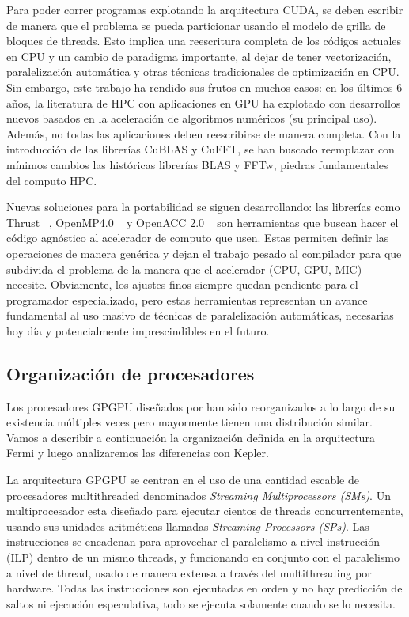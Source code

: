 Para poder correr programas explotando la arquitectura CUDA, se deben escribir de manera que
el problema se pueda particionar usando el modelo de grilla de bloques de threads. Esto implica una
reescritura completa de los c\'odigos actuales en CPU y un cambio de paradigma importante, al
dejar de tener vectorizaci\'on, paralelizaci\'on autom\'atica y otras t\'ecnicas tradicionales
de optimizaci\'on en CPU. Sin embargo, este trabajo ha rendido sus frutos en muchos casos:
en los \'ultimos 6 a\~nos, la literatura de HPC con aplicaciones en GPU ha explotado con
desarrollos nuevos basados en la aceleraci\'on de algoritmos num\'ericos (su principal uso).
Adem\'as, no todas las aplicaciones deben reescribirse de manera completa. Con la introducci\'on
de las librer\'ias CuBLAS y CuFFT, se han buscado reemplazar con m\'inimos cambios las hist\'oricas
librer\'ias BLAS y FFTw, piedras fundamentales del computo HPC.~\cite{cublas}~\cite{cufft}

Nuevas soluciones para la portabilidad se siguen desarrollando: las librer\'ias como Thrust ~\cite{thrust},
OpenMP4.0 ~\cite{OpenMPspec} y OpenACC 2.0 ~\cite{OpenACCSpec} son herramientas que buscan hacer el
c\'odigo agn\'ostico al acelerador de computo que usen. Estas permiten definir las operaciones de
manera gen\'erica y dejan el trabajo pesado al compilador para que subdivida el problema de la manera
que el acelerador (CPU, GPU, MIC) necesite. Obviamente, los ajustes finos siempre quedan pendiente para
el programador especializado, pero estas herramientas representan un avance fundamental al uso
masivo de t\'ecnicas de paralelizaci\'on autom\'aticas, necesarias hoy d\'ia y potencialmente
imprescindibles en el futuro.

\subsection{Organizaci\'on de procesadores}

Los procesadores GPGPU dise\~nados por \nvidia han sido reorganizados a lo largo de su
existencia m\'ultiples veces pero mayormente tienen una distribuci\'on similar. Vamos a describir a continuaci\'on
la organizaci\'on definida en la arquitectura Fermi y luego analizaremos las diferencias con Kepler.

La arquitectura GPGPU se centran en el uso de una cantidad escable de procesadores
multithreaded denominados \textit{Streaming Multiprocessors (SMs)}. Un multiprocesador esta dise\~nado
para ejecutar cientos de threads concurrentemente, usando sus unidades aritm\'eticas llamadas \textit{Streaming
Processors (SPs)}. Las instrucciones se encadenan para aprovechar el paralelismo
a nivel instrucci\'on (ILP) dentro de un mismo threads, y funcionando en conjunto con el paralelismo
a nivel de thread, usado de manera extensa a trav\'es del multithreading por hardware. Todas las instrucciones
son ejecutadas en orden y no hay predicci\'on de saltos ni ejecuci\'on especulativa, todo se ejecuta solamente
cuando se lo necesita. ~\cite{CudaOverview}


